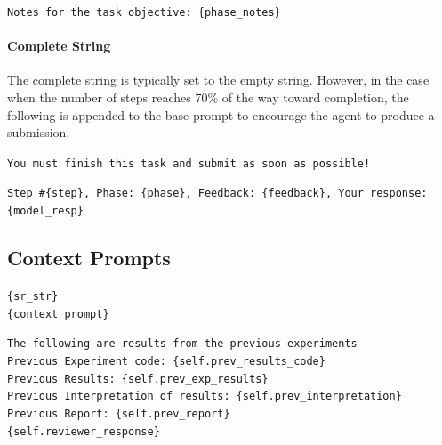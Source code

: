 \documentclass[11pt, a4paper]{gdm_format}
\begin{document}
\begin{tcolorbox}[breakable,colback=orange!5!white, colframe=orange!80!black, title=Phase Notes (notes\_str)]
\texttt{Notes for the task objective: \{phase\_notes\}}
\end{tcolorbox}

\paragraph{Complete String}
The complete string is typically set to the empty string. However, in the case when the number of steps reaches 70\% of the way toward completion, the following is appended to the base prompt to encourage the agent to produce a submission.

\begin{tcolorbox}[breakable,colback=orange!5!white, colframe=orange!80!black, title=Complete String (complete\_str)]
\texttt{You must finish this task and submit as soon as possible!}
\end{tcolorbox}

\begin{tcolorbox}[breakable,colback=orange!5!white, colframe=orange!80!black, title=History Line]
\texttt{Step \#\{step\}, Phase: \{phase\}, Feedback: \{feedback\}, Your response: \{model\_resp\}}
\end{tcolorbox}



\subsection{Context Prompts}


\begin{tcolorbox}[breakable,colback=orange!5!white, colframe=orange!80!black, title=Context Prompt]
\texttt{\{sr\_str\}\\\{context\_prompt\}}
\end{tcolorbox}


\begin{tcolorbox}[breakable,colback=orange!5!white, colframe=orange!80!black, title=Context Prompt Second Round String (sr\_string)]
\texttt{The following are results from the previous experiments\\Previous Experiment code: \{self.prev\_results\_code\}\\Previous Results: \{self.prev\_exp\_results\}\\Previous Interpretation of results: \{self.prev\_interpretation\}\\Previous Report: \{self.prev\_report\}\\\{self.reviewer\_response\}}
\end{tcolorbox}
\end{document}
